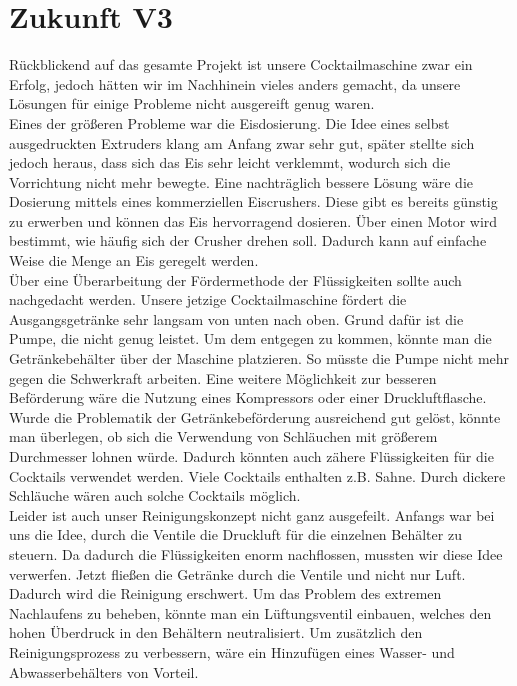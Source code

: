 \documentclass[10pt,a4paper]{report}
\begin{document}
	\chapter{Zukunft V3}
	Rückblickend auf das gesamte Projekt ist unsere Cocktailmaschine zwar ein Erfolg, jedoch hätten wir im Nachhinein vieles anders gemacht, da unsere Lösungen für einige Probleme nicht ausgereift genug waren.
	\\
	Eines der größeren Probleme war die Eisdosierung. Die Idee eines selbst ausgedruckten Extruders klang am Anfang zwar sehr gut, später stellte sich jedoch heraus, dass sich das Eis sehr leicht verklemmt, wodurch sich die Vorrichtung nicht mehr bewegte. Eine nachträglich bessere Lösung wäre die Dosierung mittels eines kommerziellen Eiscrushers. Diese gibt es bereits günstig zu erwerben und können das Eis hervorragend dosieren. Über einen Motor wird bestimmt, wie häufig sich der Crusher drehen soll. Dadurch kann auf einfache Weise die Menge an Eis geregelt werden. 
	\\
	Über eine Überarbeitung der Fördermethode der Flüssigkeiten sollte auch nachgedacht werden. Unsere jetzige Cocktailmaschine fördert die Ausgangsgetränke sehr langsam von unten nach oben. Grund dafür ist die Pumpe, die nicht genug leistet. Um dem entgegen zu kommen, könnte man die Getränkebehälter über der Maschine platzieren. So müsste die Pumpe nicht mehr gegen die Schwerkraft arbeiten. Eine weitere Möglichkeit zur besseren Beförderung wäre die Nutzung eines Kompressors oder einer Druckluftflasche.
	\\
	Wurde die Problematik der Getränkebeförderung ausreichend gut gelöst, könnte man überlegen, ob sich die Verwendung von Schläuchen mit größerem Durchmesser lohnen würde. Dadurch könnten auch zähere Flüssigkeiten für die Cocktails verwendet werden. Viele Cocktails enthalten z.B. Sahne. Durch dickere Schläuche wären auch solche Cocktails möglich.
	\\
	Leider ist auch unser Reinigungskonzept nicht ganz ausgefeilt. Anfangs war bei uns die Idee, durch die Ventile die Druckluft für die einzelnen Behälter zu steuern. Da dadurch die Flüssigkeiten enorm nachflossen, mussten wir diese Idee verwerfen. Jetzt fließen die Getränke durch die Ventile und nicht nur Luft. Dadurch wird die Reinigung erschwert. Um das Problem des extremen Nachlaufens zu beheben, könnte man ein Lüftungsventil einbauen, welches den hohen Überdruck in den Behältern neutralisiert. Um zusätzlich den Reinigungsprozess zu verbessern, wäre ein Hinzufügen eines Wasser- und Abwasserbehälters von Vorteil.
\end{document}
